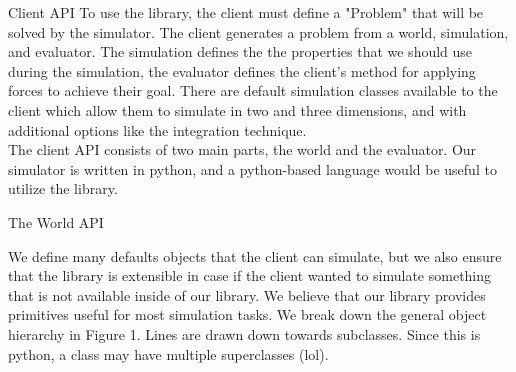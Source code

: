 \documentclass[11pt]{article}
\begin{document}
\begin{section}{Client API}
To use the library, the client must define a "Problem" that will be solved by the simulator. The client generates a problem from a world, simulation, and evaluator. The simulation defines the the properties that we should use during the simulation, the evaluator defines the client's method for applying forces to achieve their goal. There are default simulation classes available to the client which allow them to simulate in two and three dimensions, and with additional options like the integration technique. \\

The client API consists of two main parts, the world and the evaluator. Our simulator is written in python, and a python-based language would be useful to utilize the library.

\begin{subsection}{The World API}

We define many defaults objects that the client can simulate, but we also ensure that the library is extensible in case if the client wanted to simulate something that is not available inside of our library. We believe that our library provides primitives useful for most simulation tasks. We break down the general object hierarchy in Figure 1. Lines are drawn down towards subclasses. Since this is python, a class may have multiple superclasses (lol).\\

\begin{center}
\end{center}
\end{subsection}
\end{section}
\end{document}
